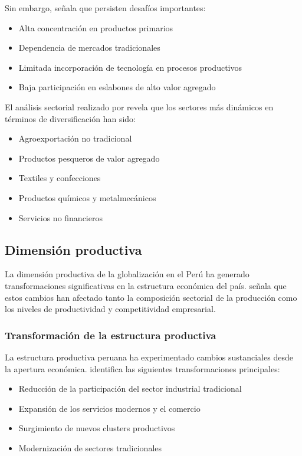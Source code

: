 \documentclass[12pt, a4paper]{article}
\begin{document}
Sin embargo, \textcite{fairlie2020} señala que persisten desafíos importantes:
\begin{itemize}
    \item Alta concentración en productos primarios
    \item Dependencia de mercados tradicionales
    \item Limitada incorporación de tecnología en procesos productivos
    \item Baja participación en eslabones de alto valor agregado
\end{itemize}

El análisis sectorial realizado por \textcite{sanchez2020} revela que los sectores más dinámicos en términos de diversificación han sido:
\begin{itemize}
    \item Agroexportación no tradicional
    \item Productos pesqueros de valor agregado
    \item Textiles y confecciones
    \item Productos químicos y metalmecánicos
    \item Servicios no financieros
\end{itemize}

\subsection{Dimensión productiva}

La dimensión productiva de la globalización en el Perú ha generado transformaciones significativas en la estructura económica del país. \textcite{tavara2020} señala que estos cambios han afectado tanto la composición sectorial de la producción como los niveles de productividad y competitividad empresarial.

\subsubsection{Transformación de la estructura productiva}
La estructura productiva peruana ha experimentado cambios sustanciales desde la apertura económica. \textcite{jimenez2021} identifica las siguientes transformaciones principales:

\begin{itemize}
    \item Reducción de la participación del sector industrial tradicional
    \item Expansión de los servicios modernos y el comercio
    \item Surgimiento de nuevos clusters productivos
    \item Modernización de sectores tradicionales
\end{itemize}
\end{document}

